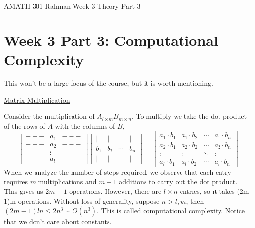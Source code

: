 \documentclass[reqno]{amsart}
\theoremstyle{definition}
\begin{document}
\begin{flushleft}
{\sc \Large AMATH 301 Rahman} \hfill Week 3 Theory Part 3
\bigskip
\end{flushleft}

\newcommand{\R}{\mathbb{R}}
\newcommand{\N}{\mathbb{N}}
\newcommand{\Z}{\mathbb{Z}}
\newcommand{\Q}{\mathbb{Q}}
\renewcommand{\CancelColor}{\color{red}}
\newcommand{\?}{\stackrel{?}{=}}
\renewcommand{\varphi}{\phi}
\newcommand{\card}{\text{Card}}
\newcommand{\bigzero}{\text{\Huge 0}}
\newcommand{\curvearrowdown}{{\color{red}\rotatebox{90}{$\curvearrowleft$}}}
\newcommand{\curvearrowup}{{\color{red}\rotatebox{90}{$\curvearrowright$}}}



\section*{Week 3 Part 3:  Computational Complexity}

This won't be a large focus of the course, but it is worth mentioning.

\underline{Matrix Multiplication}

Consider the multiplication of $A_{l\times m}B_{m\times n}$.  To multiply we take the dot product of the rows of $A$ with the columns of $B$,
%
\begin{equation*}
\begin{bmatrix}
--- & a_1 & ---\\
--- & a_2 & ---\\
 & \vdots & \\
 --- & a_l & ---
\end{bmatrix}\begin{bmatrix}
| & | &  & |\\
b_1 & b_2 & \cdots & b_n\\
| & | & & |
\end{bmatrix} = \begin{bmatrix}
a_1\cdot b_1 & a_1\cdot b_2 & \cdots & a_1\cdot b_n\\
a_2\cdot b_1 & a_2\cdot b_2 & \cdots & a_2\cdot b_n\\
\vdots & \vdots & \ddots & \vdots\\
a_l\cdot b_1 & a_l\cdot b_2 & \cdots & a_l\cdot b_n
\end{bmatrix}
\end{equation*}
%
When we analyze the number of steps required, we observe that each entry requires $m$ multiplications and $m-1$ additions to carry out the dot product.  This gives us $2m-1$ operations.  However, there are $l\times n$ entries, so it takes (2m-1)ln operations.  Without loss of generality, suppose $n > l,m$, then $(2m-1)ln \leq 2n^3 \sim O(n^3)$.  {\color{red}This is called \underline{computational complexity}.}  {\color{blue}Notice that we don't care about constants.}
\end{document}
